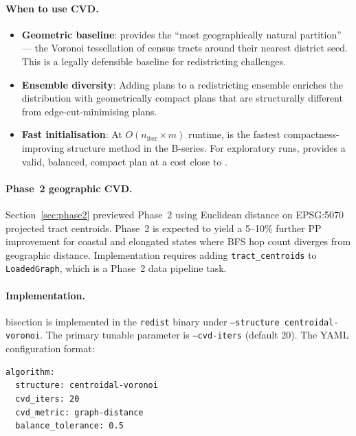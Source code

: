 \paragraph{When to use CVD.}
\begin{itemize}
\item \textbf{Geometric baseline}: \cvd{} provides the ``most geographically
  natural partition'' --- the Voronoi tessellation of census tracts around
  their nearest district seed.
  This is a legally defensible baseline for redistricting challenges.
\item \textbf{Ensemble diversity}: Adding \cvd{} plans to a redistricting
  ensemble enriches the distribution with geometrically compact plans that
  are structurally different from edge-cut-minimising plans.
\item \textbf{Fast initialisation}: At $O(n_{\mathrm{iter}} \times m)$ runtime,
  \cvd{} is the fastest compactness-improving structure method in the B-series.
  For exploratory runs, \cvd{} provides a valid, balanced, compact plan
  at a cost close to \metis{}.
\end{itemize}

\paragraph{Phase~2 geographic CVD.}
Section~\ref{sec:phase2} previewed Phase~2 \cvd{} using Euclidean distance
on EPSG:5070 projected tract centroids.
Phase~2 is expected to yield a 5--10\% further PP improvement for coastal
and elongated states where BFS hop count diverges from geographic distance.
Implementation requires adding \texttt{tract\_centroids} to
\texttt{LoadedGraph}, which is a Phase~2 data pipeline task.

\paragraph{Implementation.}
\cvd{} bisection is implemented in the \texttt{redist} binary under
\texttt{--structure centroidal-voronoi}.
The primary tunable parameter is \texttt{--cvd-iters} (default 20).
The YAML configuration format:
\begin{verbatim}
algorithm:
  structure: centroidal-voronoi
  cvd_iters: 20
  cvd_metric: graph-distance
  balance_tolerance: 0.5
\end{verbatim}

